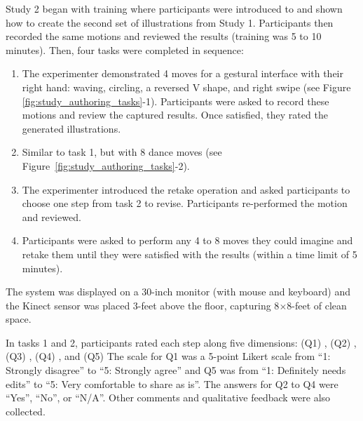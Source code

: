 %
Study 2 began with training where participants were introduced to \systemname{} and shown how to create the second set of illustrations from Study 1.
Participants then recorded the same motions and reviewed the results (training was 5 to 10 minutes).
%
Then, four tasks were completed in sequence:
\begin{enumerate}
  \item The experimenter demonstrated 4 moves for a gestural interface with their right hand: waving, circling, a reversed V shape, and right swipe (see Figure \ref{fig:study_authoring_tasks}-1). Participants were asked to record these motions and review the captured results. Once satisfied, they rated the generated illustrations.
  \item Similar to task 1, but with 8 dance moves (see Figure~\ref{fig:study_authoring_tasks}-2).
  \item The experimenter introduced the retake operation and asked participants to choose one step from task 2 to revise. Participants re-performed the motion and reviewed.
  \item Participants were asked to perform any 4 to 8 moves they could imagine and retake them until they were satisfied with the results (within a time limit of 5 minutes).
\end{enumerate}
%
The system was displayed on a 30-inch monitor (with mouse and keyboard) and the Kinect sensor was placed 3-feet above the floor, capturing 8$\times$8-feet of clean space.

%
In tasks 1 and 2, participants rated each step along five dimensions: (Q1) , (Q2) , (Q3) , (Q4) , and (Q5) 
%
The scale for Q1 was a 5-point Likert scale from ``1: Strongly disagree'' to ``5: Strongly agree'' and Q5 was from ``1: Definitely needs edits'' to ``5: Very comfortable to share as is''. The answers for Q2 to Q4 were ``Yes'', ``No'', or ``N/A''.
%
%
Other comments and qualitative feedback were also collected.


